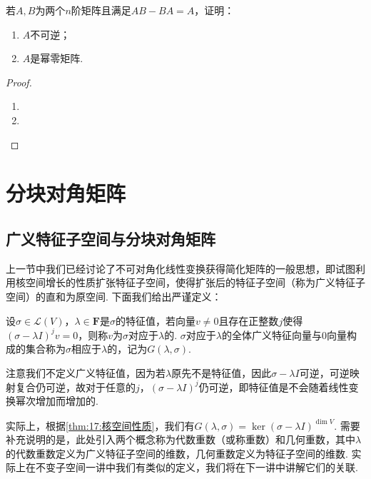 \begin{example}
    若$A,B$为两个$n$阶矩阵且满足$AB-BA=A$，证明：
    \begin{enumerate}
        \item $A$不可逆；

        \item $A$是幂零矩阵.
    \end{enumerate}
\end{example}

\begin{proof}
    \begin{enumerate}
        \item

        \item
    \end{enumerate}
\end{proof}

\section{分块对角矩阵}

\subsection{广义特征子空间与分块对角矩阵}

上一节中我们已经讨论了不可对角化线性变换获得简化矩阵的一般思想，即试图利用核空间增长的性质扩张特征子空间，使得扩张后的特征子空间（称为广义特征子空间）的直和为原空间. 下面我们给出严谨定义：
\begin{definition}
    设$\sigma\in \mathcal{L}(V)$，$\lambda\in\mathbf{F}$是$\sigma$的特征值，若向量$v\neq 0$且存在正整数$j$使得$(\sigma-\lambda I)^jv=0$，则称$v$为$\sigma$对应于$\lambda$的. $\sigma$对应于$\lambda$的全体广义特征向量与0向量构成的集合称为$\sigma$相应于$\lambda$的，记为$G(\lambda,\sigma)$.
\end{definition}
注意我们不定义广义特征值，因为若$\lambda$原先不是特征值，因此$\sigma-\lambda I$可逆，可逆映射复合仍可逆，故对于任意的$j$，$(\sigma-\lambda I)^j$仍可逆，即特征值是不会随着线性变换幂次增加而增加的.

实际上，根据\autoref{thm:17:核空间性质}，我们有$G(\lambda,\sigma)=\ker (\sigma-\lambda I)^{\dim V}$. 需要补充说明的是，此处引入两个概念称为代数重数（或称重数）和几何重数，其中$\lambda$的代数重数定义为广义特征子空间的维数，几何重数定义为特征子空间的维数. 实际上在不变子空间一讲中我们有类似的定义，我们将在下一讲中讲解它们的关联.

